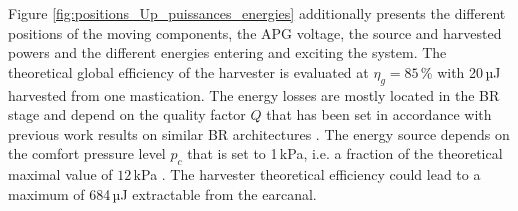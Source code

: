 \documentclass[3p,twocolumn,preprint]{elsarticle}
\begin{document}
Figure \ref{fig:positions_Up_puissances_energies} additionally presents the different positions of the moving components, the APG voltage, the source and harvested powers and the different energies entering and exciting the system. The theoretical global efficiency of the harvester is evaluated at \mbox{$\eta_g=85$\,\%} with 20\,µJ harvested from one mastication. The energy losses are mostly located in the BR stage and depend on the quality factor $Q$ that has been set in accordance with previous work results on similar BR architectures \cite{Liu2013}. The energy source depends on the comfort pressure level $p_c$ that is set to 1\,kPa, i.e. a fraction of the theoretical maximal value of $12$\,kPa \cite{Bouchard-Roy2020}. The harvester theoretical efficiency could lead to a maximum of 684\,µJ extractable from the earcanal.
\end{document}
